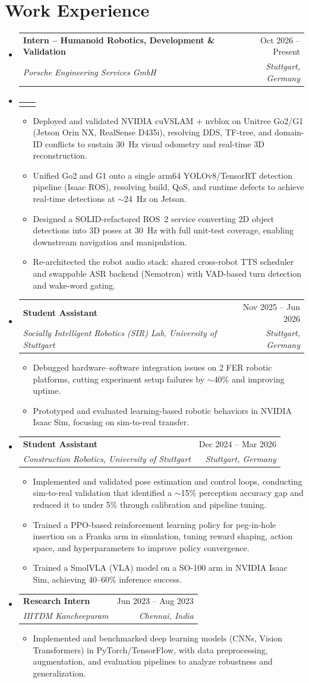 \documentclass[A4,10.5pt]{article}
\makeatletter
\newcommand{\CVItem}[1]{
  \item\small{
    {#1 \vspace{-2pt}}
  }
}
\newcommand{\CVSubheading}[4]{
  \vspace{3pt}\item
    \begin{tabular*}{0.97\textwidth}[t]{p{0.8\textwidth}@{\extracolsep{\fill}}r}
      \textbf{#1} & \small\textcolor{datecolor}{#2} \\
      \textit{\small #3} & \textit{\small\textcolor{datecolor}{#4}} \\
    \end{tabular*}\vspace{-4pt}
}
\newcommand{\CVSubSubheading}[2]{
    \item
    \begin{tabular*}{0.97\textwidth}{l@{\extracolsep{\fill}}r}
      \text{\small#1} & \text{\small #2} \\
    \end{tabular*}\vspace{-7pt}
}
\newcommand{\CVSubHeadingListStart}{\begin{itemize}[leftmargin=0.5cm, label={}]}
\newcommand{\CVSubHeadingListEnd}{\end{itemize}}
\newcommand{\CVItemListStart}{\begin{itemize}}
\newcommand{\CVItemListEnd}{\end{itemize}\vspace{-11pt}}
\makeatother
\begin{document}
\section{Work Experience}
\CVSubHeadingListStart
\CVSubheading
  {Intern -- Humanoid Robotics, Development \& Validation}{Oct 2026 -- Present}
  {Porsche Engineering Services GmbH}{Stuttgart, Germany}
\CVSubSubheading
  {Working Student -- Humanoid Robotics, Development \& Validation}{Apr 2026 -- Sep 2026}
\CVItemListStart
    \CVItem{Deployed and validated NVIDIA cuVSLAM + nvblox on Unitree Go2/G1 (Jetson Orin NX, RealSense D435i), resolving DDS, TF-tree, and domain-ID conflicts to sustain 30~Hz visual odometry and real-time 3D reconstruction.}
    \CVItem{Unified Go2 and G1 onto a single arm64 YOLOv8/TensorRT detection pipeline (Isaac ROS), resolving build, QoS, and runtime defects to achieve real-time detections at $\sim$24~Hz on Jetson.}
    \CVItem{Designed a SOLID-refactored ROS~2 service converting 2D object detections into 3D poses at 30~Hz with full unit-test coverage, enabling downstream navigation and manipulation.}
    \CVItem{Re-architected the robot audio stack: shared cross-robot TTS scheduler and swappable ASR backend (Nemotron) with VAD-based turn detection and wake-word gating.}
\CVItemListEnd
\CVSubheading
  {Student Assistant}{Nov 2025 -- Jun 2026}
  {Socially Intelligent Robotics (SIR) Lab, University of Stuttgart}{Stuttgart, Germany}
\CVItemListStart
    \CVItem{Debugged hardware--software integration issues on 2 FER robotic platforms, cutting experiment setup failures by $\sim$40\% and improving uptime.}
    \CVItem{Prototyped and evaluated learning-based robotic behaviors in NVIDIA Isaac Sim, focusing on sim-to-real transfer.}
\CVItemListEnd
\CVSubheading
  {Student Assistant}{Dec 2024 -- Mar 2026}
  {Construction Robotics, University of Stuttgart}{Stuttgart, Germany}
\CVItemListStart
    \CVItem{Implemented and validated pose estimation and control loops, conducting sim-to-real validation that identified a $\sim$15\% perception accuracy gap and reduced it to under 5\% through calibration and pipeline tuning.}
    \CVItem{Trained a PPO-based reinforcement learning policy for peg-in-hole insertion on a Franka arm in simulation, tuning reward shaping, action space, and hyperparameters to improve policy convergence.}
    \CVItem{Trained a SmolVLA (VLA) model on a SO-100 arm in NVIDIA Isaac Sim, achieving 40--60\% inference success.}
\CVItemListEnd
\CVSubheading
  {Research Intern}{Jun 2023 -- Aug 2023}
  {IIITDM Kancheepuram}{Chennai, India}
\CVItemListStart
    \CVItem{Implemented and benchmarked deep learning models (CNNs, Vision Transformers) in PyTorch/TensorFlow, with data preprocessing, augmentation, and evaluation pipelines to analyze robustness and generalization.}
\CVItemListEnd
\CVSubHeadingListEnd
\end{document}
